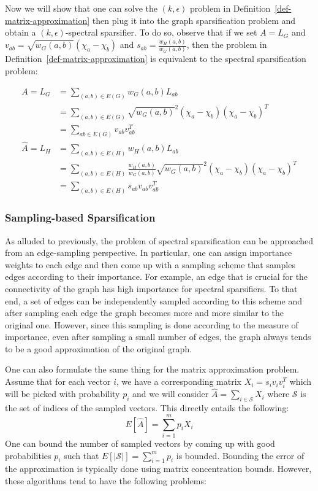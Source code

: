 \documentclass[
  letterpaper,
  DIV=11,
  numbers=noendperiod]{scrartcl}
\theoremstyle{plain}
\theoremstyle{plain}
\theoremstyle{plain}
\theoremstyle{definition}
\theoremstyle{plain}
\theoremstyle{remark}
\begin{document}
Now we will show that one can solve the \((k, \epsilon)\) problem in
Definition~\ref{def-matrix-approximation} then plug it into the graph
sparsification problem and obtain a \((k, \epsilon)\)-spectral
sparsifier. To do so, observe that if we set \(A = L_G\) and
\(v_{ab} = \sqrt{w_G(a,b)} (\chi_a - \chi_b)\) and
\(s_{ab} = \frac{w_H(a,b)}{w_G(a,b)}\), then the problem in
Definition~\ref{def-matrix-approximation} is equivalent to the spectral
sparsification problem:

\begin{align*}
A = L_G &= \sum_{(a,b) \in E(G)} w_G(a,b) L_{ab} \\
&= \sum_{(a,b) \in E(G)} \sqrt{w_G(a,b)}^2 (\chi_a - \chi_b) (\chi_a - \chi_b)^T\\
& = \sum_{ab \in E(G)} v_{ab} v_{ab}^T\\
\hat{A} = L_H &= \sum_{(a, b) \in E(H)} w_H(a,b) L_{ab} \\
&= \sum_{(a, b) \in E(H)} \frac{w_H(a,b)}{w_G(a,b)} \sqrt{w_G(a,b)}^2 (\chi_a - \chi_b) (\chi_a - \chi_b)^T\\
&= \sum_{(a,b) \in E(H)} s_{ab} v_{ab} v_{ab}^T
\end{align*}

\hypertarget{sampling-based-sparsification}{%
\subsubsection{Sampling-based
Sparsification}\label{sampling-based-sparsification}}

As alluded to previously, the problem of spectral sparsification can be
approached from an edge-sampling perspective. In particular, one can
assign importance weights to each edge and then come up with a sampling
scheme that samples edges according to their importance. For example, an
edge that is crucial for the connectivity of the graph has high
importance for spectral sparsifiers. To that end, a set of edges can be
independently sampled according to this scheme and after sampling each
edge the graph becomes more and more similar to the original one.
However, since this sampling is done according to the measure of
importance, even after sampling a small number of edges, the graph
always tends to be a good approximation of the original graph.

One can also formulate the same thing for the matrix approximation
problem. Assume that for each vector \(i\), we have a corresponding
matrix \(X_i = s_i v_i v_i^T\) which will be picked with probability
\(p_i\) and we will consider \(\hat{A} = \sum_{i \in \mathcal{S}} X_i\)
where \(\mathcal{S}\) is the set of indices of the sampled vectors. This
directly entails the following: \[E[\hat{A}] = \sum_{i=1}^m p_i X_i\]
One can bound the number of sampled vectors by coming up with good
probabilities \(p_i\) such that \(E[|\mathcal{S}|] = \sum_{i=1}^m p_i\)
is bounded. Bounding the error of the approximation is typically done
using matrix concentration bounds. However, these algorithms tend to
have the following problems:
\end{document}
